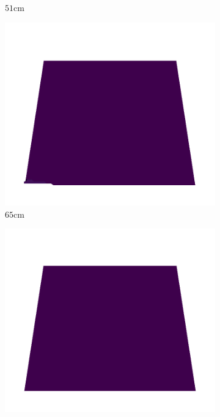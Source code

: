 \documentclass[../document.tex]{subfiles}
\begin{document}
\begin{figure}[htbp]
\begin{subfigure}[b]{0.19\textwidth}
    \caption{$51$cm}
    \end{subfigure}
    \begin{subfigure}[b]{0.19\textwidth}
    \includegraphics[width=\linewidth]{../img/5/quarry/all/best/65-patch-3d-majavi-colormap-6.png}
    \caption{$65$cm}
    \end{subfigure}
    \begin{subfigure}[b]{0.19\textwidth}
    \includegraphics[width=\linewidth]{../img/5/quarry/all/best/67-patch-3d-majavi-colormap-7.png}

\end{subfigure}
\end{figure}
\end{document}
